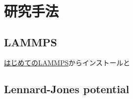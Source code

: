 \chapter{研究手法}

\section{LAMMPS}

\href{https://qiita.com/m-agnet/items/4871bff968bbdace897b}{はじめてのLAMMPS}からインストールと

\section{Lennard-Jones potential}
